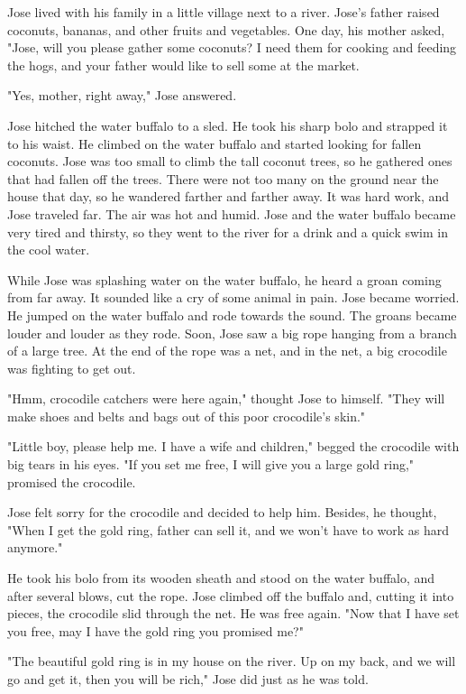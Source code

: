 Jose lived with his family in a little village next to a river. Jose's father raised coconuts, bananas, and other fruits and vegetables. One day, his mother asked, "Jose, will you please gather some coconuts? I need them for cooking and feeding the hogs, and your father would like to sell some at the market.

"Yes, mother, right away," Jose answered.

Jose hitched the water buffalo to a sled. He took his sharp bolo and strapped it to his waist. He climbed on the water buffalo and started looking for fallen coconuts. Jose was too small to climb the tall coconut trees, so he gathered ones that had fallen off the trees. There were not too many on the ground near the house that day, so he wandered farther and farther away. It was hard work, and Jose traveled far. The air was hot and humid. Jose and the water buffalo became very tired and thirsty, so they went to the river for a drink and a quick swim in the cool water.

While Jose was splashing water on the water buffalo, he heard a groan coming from far away. It sounded like a cry of some animal in pain. Jose became worried. He jumped on the water buffalo and rode towards the sound. The groans became louder and louder as they rode. Soon, Jose saw a big rope hanging from a branch of a large tree. At the end of the rope was a net, and in the net, a big crocodile was fighting to get out.

"Hmm, crocodile catchers were here again," thought Jose to himself. "They will make shoes and belts and bags out of this poor crocodile's skin."

"Little boy, please help me. I have a wife and children," begged the crocodile with big tears in his eyes. "If you set me free, I will give you a large gold ring," promised the crocodile.

Jose felt sorry for the crocodile and decided to help him. Besides, he thought, "When I get the gold ring, father can sell it, and we won't have to work as hard anymore."

He took his bolo from its wooden sheath and stood on the water buffalo, and after several blows, cut the rope. Jose climbed off the buffalo and, cutting it into pieces, the crocodile slid through the net. He was free again. "Now that I have set you free, may I have the gold ring you promised me?"

"The beautiful gold ring is in my house on the river. Up on my back, and we will go and get it, then you will be rich," Jose did just as he was told.

